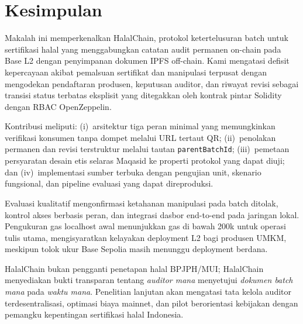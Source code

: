 \section{Kesimpulan}
\label{sec:conclusion}

Makalah ini memperkenalkan HalalChain, protokol ketertelusuran batch untuk sertifikasi halal yang menggabungkan catatan audit permanen on-chain pada Base L2 dengan penyimpanan dokumen IPFS off-chain.
Kami mengatasi defisit kepercayaan akibat pemalsuan sertifikat dan manipulasi terpusat dengan mengodekan pendaftaran produsen, keputusan auditor, dan riwayat revisi sebagai transisi status terbatas eksplisit yang ditegakkan oleh kontrak pintar Solidity dengan RBAC OpenZeppelin.

Kontribusi meliputi: (i)~arsitektur tiga peran minimal yang memungkinkan verifikasi konsumen tanpa dompet melalui URL tertaut QR; (ii)~penolakan permanen dan revisi terstruktur melalui tautan \texttt{parentBatchId}; (iii)~pemetaan persyaratan desain etis selaras Maqasid ke properti protokol yang dapat diuji; dan (iv)~implementasi sumber terbuka dengan pengujian unit, skenario fungsional, dan pipeline evaluasi yang dapat direproduksi.

Evaluasi kualitatif mengonfirmasi ketahanan manipulasi pada batch ditolak, kontrol akses berbasis peran, dan integrasi dasbor end-to-end pada jaringan lokal.
Pengukuran gas localhost awal menunjukkan gas di bawah 200k untuk operasi tulis utama, mengisyaratkan kelayakan deployment L2 bagi produsen UMKM, meskipun tolok ukur Base Sepolia masih menunggu deployment berdana.

HalalChain bukan pengganti penetapan halal BPJPH/MUI; HalalChain menyediakan bukti transparan tentang \emph{auditor mana} menyetujui \emph{dokumen batch mana} pada \emph{waktu mana}.
Penelitian lanjutan akan mengatasi tata kelola auditor terdesentralisasi, optimasi biaya mainnet, dan pilot berorientasi kebijakan dengan pemangku kepentingan sertifikasi halal Indonesia.
